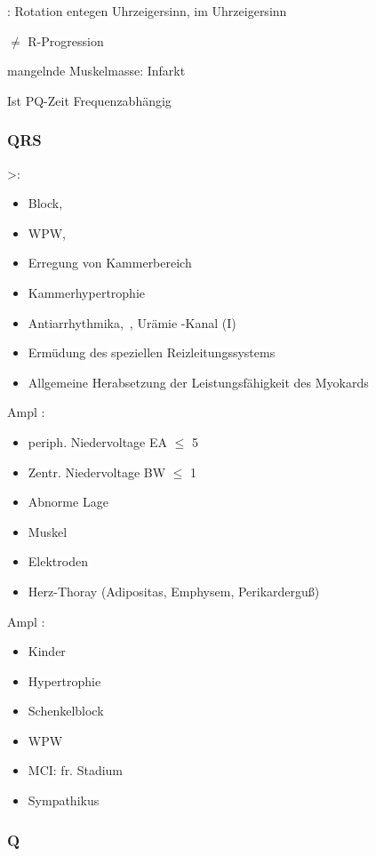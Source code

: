 : Rotation entegen Uhrzeigersinn,  im
Uhrzeigersinn

$\neq$ R-Progression

 mangelnde Muskelmasse: Infarkt

Ist PQ-Zeit Frequenzabhängig

\subsubsection{QRS}

>: 
\begin{itemize}
  \item Block, 
  \item WPW, 
  \item Erregung von Kammerbereich
  \item Kammerhypertrophie
  \item Antiarrhythmika, \,, Urämie  -Kanal
  (I)
  \item Ermüdung des speziellen Reizleitungssystems
  \item Allgemeine Herabsetzung der Leistungsfähigkeit des
  Myokards
\end{itemize}

Ampl :
\begin{itemize}
  \item periph. Niedervoltage EA $\leq$ 5\,
  \item Zentr. Niedervoltage BW $\leq$ 1\,
  \item Abnorme Lage
  \item Muskel 
  \item Elektroden
  \item Herz-Thoray (Adipositas, Emphysem, Perikarderguß)
\end{itemize}

Ampl :
\begin{itemize}
  \item Kinder
  \item Hypertrophie
  \item Schenkelblock
  \item WPW
  \item MCI: fr. Stadium
  \item Sympathikus 
\end{itemize}

\subsubsection{Q}

